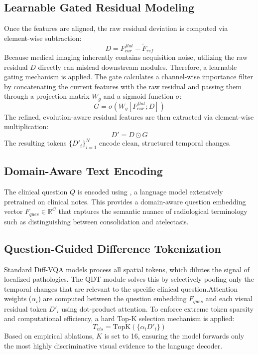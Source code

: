 \subsection{Learnable Gated Residual Modeling}
Once the features are aligned, the raw residual deviation is computed via element-wise subtraction:
	\begin{equation}
		D = F_{cur}^{flat} - \tilde{F}_{ref}
	\end{equation}
Because medical imaging inherently contains acquisition noise, utilizing the raw residual $D$ directly can mislead downstream modules. Therefore, a learnable gating mechanism is applied. The gate calculates a channel-wise importance filter by concatenating the current features with the raw residual and passing them through a projection matrix $W_g$ and a sigmoid function $\sigma$:
	\begin{equation}
		G = \sigma(W_g[F_{cur}^{flat} ; D])
	\end{equation}
The refined, evolution-aware residual features are then extracted via element-wise multiplication:
	\begin{equation}
		D' = D \odot G
	\end{equation}
The resulting tokens $\{D'_i\}_{i=1}^N$ encode clean, structured temporal changes.

\subsection{Domain-Aware Text Encoding}
The clinical question $Q$ is encoded using \cite{bio-clinical-bert}, a language model extensively pretrained on clinical notes. This provides a domain-aware question embedding vector $F_{ques} \in \mathbb{R}^C$ that captures the semantic nuance of radiological terminology such as distinguishing between consolidation and atelectasis.

\subsection{Question-Guided Difference Tokenization}
Standard Diff-VQA models process all spatial tokens, which dilutes the signal of localized pathologies. The QDT module solves this by selectively pooling only the temporal changes that are relevant to the specific clinical question.Attention weights ($\alpha_i$) are computed between the question embedding $F_{ques}$ and each visual residual token $D'_i$ using dot-product attention. To enforce extreme token sparsity and computational efficiency, a hard Top-K selection mechanism is applied:
\begin{equation}
	T_{vis} = \text{TopK}(\{\alpha_i D'_i\})
\end{equation}
Based on empirical ablations, $K$ is set to 16, ensuring the model forwards only the most highly discriminative visual evidence to the language decoder.

